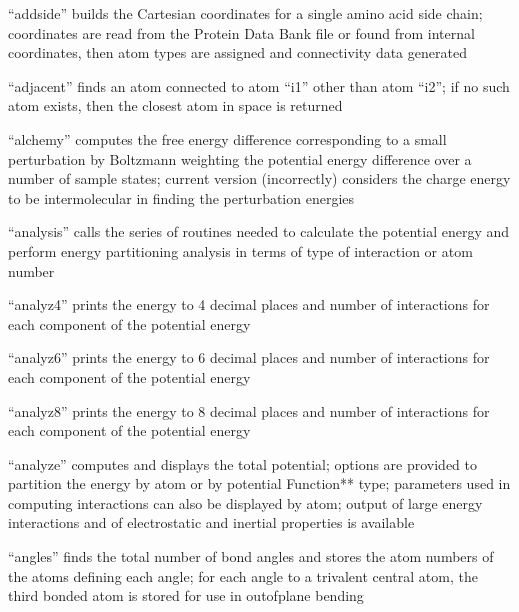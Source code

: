 \documentclass[letterpaper,11pt,english]{sphinxmanual}
\begin{document}

“addside” builds the Cartesian coordinates for a single amino acid side chain; coordinates are read from the Protein Data Bank file or found from internal coordinates, then atom types are assigned and connectivity data generated


“adjacent” finds an atom connected to atom “i1” other than atom “i2”; if no such atom exists, then the closest atom in space is returned


“alchemy” computes the free energy difference corresponding to a small perturbation by Boltzmann weighting the potential energy difference over a number of sample states; current version (incorrectly) considers the charge energy to be intermolecular in finding the perturbation energies


“analysis” calls the series of routines needed to calculate the potential energy and perform energy partitioning analysis in terms of type of interaction or atom number


“analyz4” prints the energy to 4 decimal places and number of interactions for each component of the potential energy


“analyz6” prints the energy to 6 decimal places and number of interactions for each component of the potential energy


“analyz8” prints the energy to 8 decimal places and number of interactions for each component of the potential energy


“analyze” computes and displays the total potential; options are provided to partition the energy by atom or by potential Function** type; parameters used in computing interactions can also be displayed by atom; output of large energy interactions and of electrostatic and inertial properties is available


“angles” finds the total number of bond angles and stores the atom numbers of the atoms defining each angle; for each angle to a trivalent central atom, the third bonded atom is stored for use in out\sphinxhyphen{}of\sphinxhyphen{}plane bending
\end{document}
